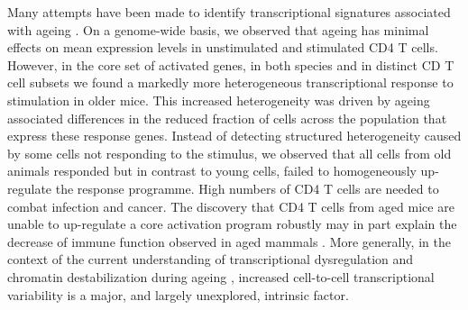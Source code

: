 Many attempts have been made to identify transcriptional signatures associated with ageing \citep{DeMagalhaes2009, Magalhaes2009, Chen2013, Kowalczyk2015}. On a genome-wide basis, we observed that ageing has minimal effects on mean expression levels in unstimulated and stimulated CD4\plus{} T cells. However, in the core set of activated genes, in both species and in distinct CD\plus{} T cell subsets we found a markedly more heterogeneous transcriptional response to stimulation in older mice. This increased heterogeneity was driven by ageing associated differences in the reduced fraction of cells across the population that express these response genes. Instead of detecting structured heterogeneity caused by some cells not responding to the stimulus, we observed that all cells from old animals responded but in contrast to young cells, failed to homogeneously up-regulate the response programme. High numbers of CD4\plus{} T cells are needed to combat infection and cancer. The discovery that CD4\plus{} T cells from aged mice are unable to up-regulate a core activation program robustly may in part explain the decrease of immune function observed in aged mammals \citep{Goronzy2013, Nikolich-Zugich2018}. More generally, in the context of the current understanding of transcriptional dysregulation and chromatin destabilization during ageing \citep{Booth2016}, increased cell-to-cell transcriptional variability is a major, and largely unexplored, intrinsic factor.\\

